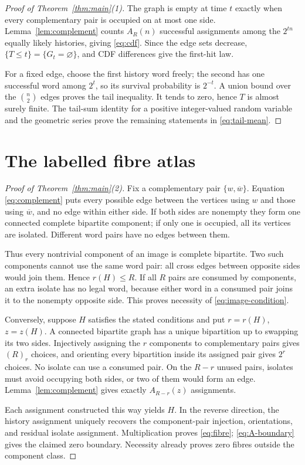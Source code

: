 \documentclass[a4paper,10pt]{amsart}
\theoremstyle{remark}
\newcommand{\cbar}[1]{\overline{#1}}
\begin{document}
\begin{proof}[Proof of Theorem~\ref{thm:main}(1)]
The graph is empty at time $t$ exactly when every complementary pair is
occupied on at most one side.  Lemma~\ref{lem:complement} counts
$A_R(n)$ successful assignments among the $2^{tn}$ equally likely histories,
giving \eqref{eq:cdf}.  Since the edge sets decrease,
$\{T\leq t\}=\{G_t=\varnothing\}$, and CDF differences give the first-hit
law.

For a fixed edge, choose the first history word freely; the second has one
successful word among $2^t$, so its survival probability is $2^{-t}$.
A union bound over the $\binom n2$ edges proves the tail inequality.  It tends
to zero, hence $T$ is almost surely finite.  The tail-sum identity for a
positive integer-valued random variable and the geometric series prove the
remaining statements in \eqref{eq:tail-mean}.
\end{proof}

\section{The labelled fibre atlas}\label{sec:fibres}

\begin{proof}[Proof of Theorem~\ref{thm:main}(2)]
Fix a complementary pair $\{w,\cbar w\}$.  Equation
\eqref{eq:complement} puts every possible edge between the vertices using
$w$ and those using $\cbar w$, and no edge within either side.  If both sides
are nonempty they form one connected complete bipartite component; if only
one is occupied, all its vertices are isolated.  Different word pairs have
no edges between them.

Thus every nontrivial component of an image is complete bipartite.  Two such
components cannot use the same word pair: all cross edges between opposite
sides would join them.  Hence $r(H)\leq R$.  If all $R$ pairs are consumed by
components, an extra isolate has no legal word, because either word in a
consumed pair joins it to the nonempty opposite side.  This proves necessity
of \eqref{eq:image-condition}.

Conversely, suppose $H$ satisfies the stated conditions and put
$r=r(H)$, $z=z(H)$.  A connected bipartite graph has a unique bipartition up
to swapping its two sides.  Injectively assigning the $r$ components to
complementary pairs gives $(R)_r$ choices, and orienting every bipartition
inside its assigned pair gives $2^r$ choices.  No isolate can use a consumed
pair.  On the $R-r$ unused pairs, isolates must avoid occupying both sides,
or two of them would form an edge.  Lemma~\ref{lem:complement} gives exactly
$A_{R-r}(z)$ assignments.

Each assignment constructed this way yields $H$.  In the reverse direction,
the history assignment uniquely recovers the component-pair injection,
orientations, and residual isolate assignment.  Multiplication proves
\eqref{eq:fibre}; \eqref{eq:A-boundary} gives the claimed zero boundary.
Necessity already proves zero fibres outside the component class.
\end{proof}
\end{document}
